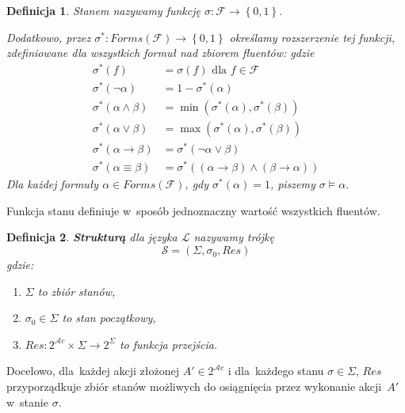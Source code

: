 \documentclass[11pt,a4paper]{article}
\newtheorem{defn}{Definicja}
\begin{document}
\begin{defn}
    Stanem nazywamy funkcję $\sigma : \mathcal{F} \rightarrow \left\{0,1\right\}$.

    Dodatkowo, przez $\sigma^{*} : Forms(\mathcal{F}) \rightarrow \left\{0,1\right\}$ określamy rozszerzenie tej funkcji, zdefiniowane dla wszystkich formuł nad zbiorem fluentów:
    gdzie
    \begin{align*}
        \sigma^{*}\left(f\right) &= \sigma\left(f\right) \text{ dla } f \in \mathcal{F} \\
        \sigma^{*}\left(\neg \alpha\right) &= 1 - \sigma^{*}\left(\alpha\right) \\
        \sigma^{*}\left(\alpha \land \beta\right) &= \min \left(\sigma^{*}\left(\alpha\right),\sigma^{*}\left(\beta\right)\right) \\
        \sigma^{*}\left(\alpha \lor \beta\right) &= \max \left(\sigma^{*}\left(\alpha\right),\sigma^{*}\left(\beta\right)\right) \\
        \sigma^{*}\left(\alpha \rightarrow \beta\right) &= \sigma^{*}\left(\neg \alpha \lor \beta\right) \\
        \sigma^{*}\left(\alpha \equiv \beta\right) &= \sigma^{*}\left(\left(\alpha \rightarrow \beta\right)\land\left(\beta \rightarrow \alpha\right)\right)
    \end{align*}
    Dla każdej formuły $\alpha \in Forms\left(\mathcal{F}\right)$, gdy $\sigma^*\left(\alpha\right) = 1$, piszemy $\sigma \models \alpha$.
\end{defn}

Funkcja stanu definiuje w~sposób jednoznaczny wartość wszystkich fluentów.

\begin{defn}
    \textbf{Strukturą} dla języka $\mathcal{L}$ nazywamy trójkę
    $$\mathcal{S} = \left(\Sigma, \sigma_0, Res\right)$$
    gdzie:
    \begin{enumerate}
        \item $\Sigma$ to zbiór stanów,
        \item $\sigma_0 \in \Sigma$ to stan początkowy,
        \item $Res : 2^{\mathcal{A}c} \times \Sigma \rightarrow 2^\Sigma$ to funkcja przejścia.
    \end{enumerate}
\end{defn}

Docelowo, dla~każdej akcji złożonej $A' \in 2^{\mathcal{A}c}$ i dla~każdego stanu $\sigma \in \Sigma$, $Res$ przyporządkuje zbiór stanów możliwych do osiągnięcia przez wykonanie akcji~$A'$ w~stanie $\sigma$.
\end{document}
